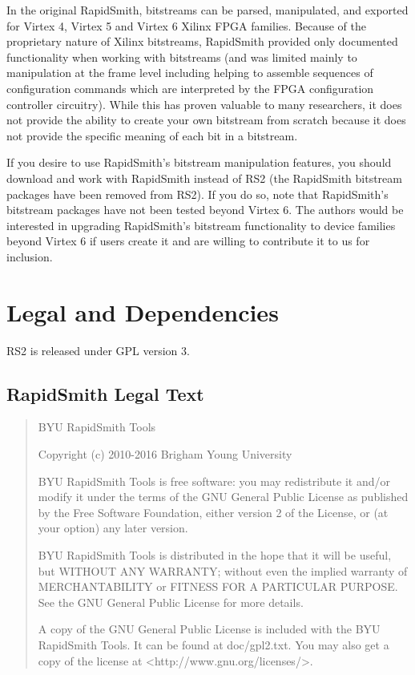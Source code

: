 \documentclass[12pt]{article}
\begin{document}
In the original RapidSmith, bitstreams can be parsed, manipulated, and exported
for Virtex 4, Virtex 5 and Virtex 6 Xilinx FPGA families.  Because of the
proprietary nature of Xilinx bitstreams, RapidSmith provided only documented
functionality when working with bitstreams (and was limited mainly to
manipulation at the frame level including helping to assemble sequences of
configuration commands which are interpreted by the FPGA configuration
controller circuitry).  While this has proven valuable to many researchers, it
does not provide the ability to create your own bitstream from scratch because
it does not provide the specific meaning of each bit in a bitstream.

If you desire to use RapidSmith’s bitstream manipulation features, you should
download and work with RapidSmith instead of RS2 (the RapidSmith bitstream
packages have been removed from RS2).  If you do so, note that RapidSmith’s
bitstream packages have not been tested beyond Virtex 6.  The authors would be
interested in upgrading RapidSmith’s bitstream functionality to device families
beyond Virtex 6 if users create it and are willing to contribute it to us for
inclusion.

\section{Legal and Dependencies}
RS2 is released under GPL version 3.

\subsection{RapidSmith Legal Text}
\begin{quotation}
   BYU RapidSmith Tools

   Copyright (c) 2010-2016 Brigham Young University
   
   BYU RapidSmith Tools is free software: you may redistribute it
   and/or modify it under the terms of the GNU General Public License
   as published by the Free Software Foundation, either version 2 of
   the License, or (at your option) any later version.
   
   BYU RapidSmith Tools is distributed in the hope that it will be
   useful, but WITHOUT ANY WARRANTY; without even the implied warranty
   of MERCHANTABILITY or FITNESS FOR A PARTICULAR PURPOSE. See the GNU
   General Public License for more details.
   
   A copy of the GNU General Public License is included with the BYU
   RapidSmith Tools. It can be found at doc/gpl2.txt. You may also get
   a copy of the license at <http://www.gnu.org/licenses/>.
\end{quotation}
\end{document}
